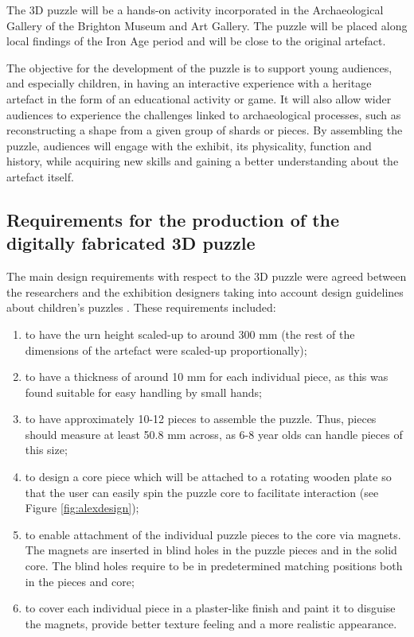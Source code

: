 \documentclass[acmlarge,screen]{acmart}
\begin{document}
The 3D puzzle will be a hands-on activity incorporated in the Archaeological Gallery of the Brighton Museum and Art Gallery. The puzzle will be placed along local findings of the Iron Age period and will be close to the original artefact.

The objective for the development of the puzzle is to support young audiences, and especially children, in having an interactive experience with a heritage artefact in the form of an educational activity or game. It will also allow wider audiences to experience the challenges linked to archaeological processes, such as reconstructing a shape from a given group of shards or pieces. By assembling the puzzle, audiences will engage with the exhibit, its physicality, function and history, while acquiring new skills and gaining a better understanding about the artefact itself.

\subsection{Requirements for the production of the digitally fabricated 3D puzzle}
The main design requirements with respect to the 3D puzzle were agreed between the researchers and the exhibition designers taking into account design guidelines about children's puzzles \cite{Smith2002}. These requirements included:
\begin{enumerate}
\item to have the urn height scaled-up to around 300 mm (the rest of the dimensions of the artefact were scaled-up proportionally);
\item to have a thickness of around 10 mm for each individual piece, as this was found suitable for easy handling by small hands;
\item to have approximately 10-12 pieces to assemble the puzzle. Thus, pieces should measure at least 50.8 mm across, as 6-8 year olds can handle pieces of this size;
\item to design a core piece which will be attached to a rotating wooden plate so that the user can easily spin the puzzle core to facilitate interaction (see Figure \ref{fig:alexdesign});
\item to enable attachment of the individual puzzle pieces to the core via magnets. The magnets are inserted in blind holes in the puzzle pieces and in the solid core. The blind holes require to be in predetermined matching positions both in the pieces and core;
\item  to cover each individual piece in a plaster-like finish and paint it to disguise the magnets, provide better texture feeling and a more realistic appearance.
\end{enumerate} 
\end{document}
